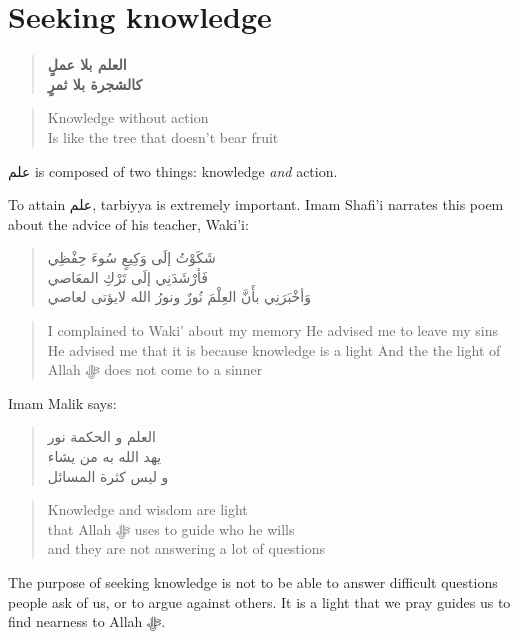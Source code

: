 \documentclass[]{book}
\begin{document}
\hypertarget{seeking-knowledge}{%
\section{Seeking knowledge}\label{seeking-knowledge}}

\begin{quote}
\textbf{العلم بلا عملٍ}\\
\textbf{كالشجرة بلا ثمرٍ}
\end{quote}

\begin{quote}
Knowledge without action\\
Is like the tree that doesn't bear fruit
\end{quote}

علم is composed of two things: knowledge \emph{and} action.

To attain علم, tarbiyya is extremely important. Imam Shafi'i narrates this poem about the advice of his teacher, Waki'i:

\begin{quote}
شَكَوْتُ إلَى وَكِيعٍ سُوءَ حِفْظِي\\
فَأرْشَدَنِي إلَى تَرْكِ المعَاصي\\
وَأخْبَرَنِي بأَنَّ العِلْمَ نُورٌ
ونورُ الله لايؤتى لعاصي
\end{quote}

\begin{quote}
I complained to Waki' about my memory
He advised me to leave my sins
He advised me that it is because knowledge is a light
And the the light of Allah ﷻ does not come to a sinner
\end{quote}

Imam Malik says:

\begin{quote}
العلم و الحكمة نور\\
يهد الله به من يشاء\\
و ليس كثرة المسائل
\end{quote}

\begin{quote}
Knowledge and wisdom are light\\
that Allah ﷻ uses to guide who he wills\\
and they are not answering a lot of questions
\end{quote}

The purpose of seeking knowledge is not to be able to answer difficult questions people ask of us, or to argue against others. It is a light that we pray guides us to find nearness to Allah ﷻ.
\end{document}
